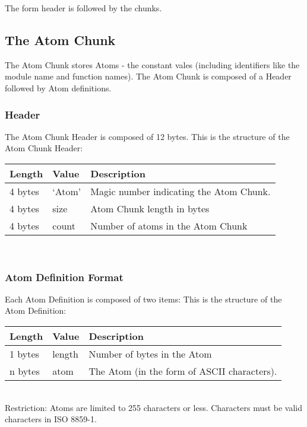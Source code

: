 \documentclass{article}
\begin{document}
The form header is followed by the chunks.

\subsection{The Atom Chunk}
The Atom Chunk stores Atoms - the constant vales
(including identifiers like the module name and function names). 
The Atom Chunk is composed of a Header followed
by Atom definitions.

\subsubsection{Header}
The Atom Chunk Header is composed of 12 bytes.
This is the structure of the Atom Chunk Header:\\
\begin{tabular}{ |l|l|p{3in}| } \hline
Length  & Value  & Description\\ \hline
4 bytes & `Atom' & Magic number indicating the Atom Chunk.\\ \hline
4 bytes & size & Atom Chunk length in bytes\\ \hline
4 bytes & count & Number of atoms in the Atom Chunk\\ \hline
\end{tabular}\\

\subsubsection{Atom Definition Format}
Each Atom Definition is composed of two items:
This is the structure of the Atom Definition:\\
\begin{tabular}{ |l|l|p{3in}| } \hline
Length  & Value  & Description\\ \hline
1 bytes & length & Number of bytes in the Atom\\ \hline
n bytes & atom & The Atom (in the form of ASCII characters). \\ \hline
\end{tabular}\\

Restriction: Atoms are limited to 255 characters or less.  Characters must be valid characters in ISO 8859-1.

\end{document}
